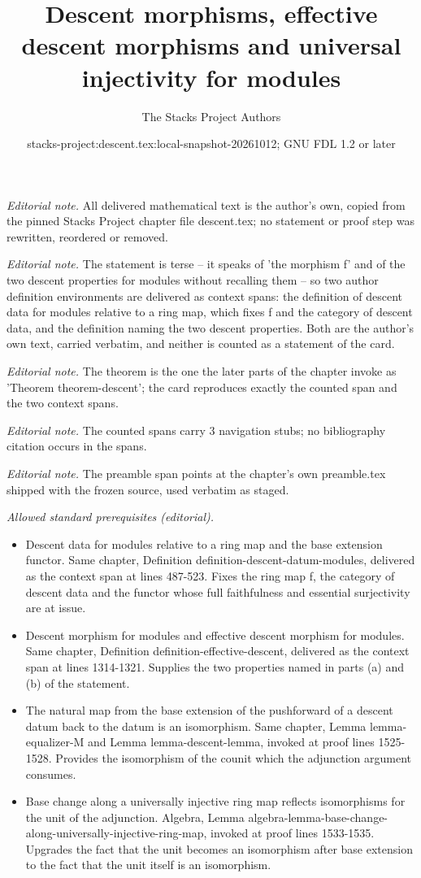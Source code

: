 \documentclass{stacks-project}
\title{Descent morphisms, effective descent morphisms and universal injectivity for modules}
\author{The Stacks Project Authors}
\date{stacks-project:descent.tex:local-snapshot-20261012; GNU FDL 1.2 or later}
\theoremstyle{plain}
\theoremstyle{definition}
\theoremstyle{remark}
\numberwithin{equation}{subsection}
\begin{document}
\maketitle
\noindent\textit{Editorial note.} All delivered mathematical text is the author's own, copied from the pinned Stacks Project chapter file descent.tex; no statement or proof step was rewritten, reordered or removed.\par\medskip
\noindent\textit{Editorial note.} The statement is terse -- it speaks of 'the morphism f' and of the two descent properties for modules without recalling them -- so two author definition environments are delivered as context spans: the definition of descent data for modules relative to a ring map, which fixes f and the category of descent data, and the definition naming the two descent properties. Both are the author's own text, carried verbatim, and neither is counted as a statement of the card.\par\medskip
\noindent\textit{Editorial note.} The theorem is the one the later parts of the chapter invoke as 'Theorem theorem-descent'; the card reproduces exactly the counted span and the two context spans.\par\medskip
\noindent\textit{Editorial note.} The counted spans carry 3 navigation stubs; no bibliography citation occurs in the spans.\par\medskip
\noindent\textit{Editorial note.} The preamble span points at the chapter's own preamble.tex shipped with the frozen source, used verbatim as staged.\par\medskip
\noindent\textit{Allowed standard prerequisites (editorial).}\begin{itemize}
\item Descent data for modules relative to a ring map and the base extension functor. Same chapter, Definition definition-descent-datum-modules, delivered as the context span at lines 487-523. Fixes the ring map f, the category of descent data and the functor whose full faithfulness and essential surjectivity are at issue.
\item Descent morphism for modules and effective descent morphism for modules. Same chapter, Definition definition-effective-descent, delivered as the context span at lines 1314-1321. Supplies the two properties named in parts (a) and (b) of the statement.
\item The natural map from the base extension of the pushforward of a descent datum back to the datum is an isomorphism. Same chapter, Lemma lemma-equalizer-M and Lemma lemma-descent-lemma, invoked at proof lines 1525-1528. Provides the isomorphism of the counit which the adjunction argument consumes.
\item Base change along a universally injective ring map reflects isomorphisms for the unit of the adjunction. Algebra, Lemma algebra-lemma-base-change-along-universally-injective-ring-map, invoked at proof lines 1533-1535. Upgrades the fact that the unit becomes an isomorphism after base extension to the fact that the unit itself is an isomorphism.
\end{itemize}\medskip
\end{document}
